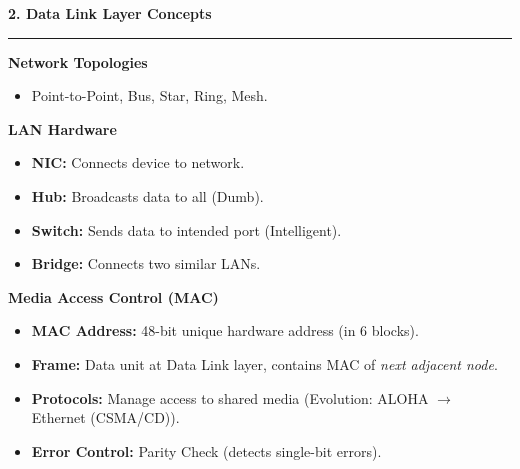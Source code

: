 \documentclass[a4paper, 8pt]{extarticle}
\newcommand{\sectionheading}[1]{\large\textbf{#1}\par\noindent\rule{\linewidth}{0.4pt}}
\newcommand{\subsectionheading}[1]{\normalsize\textbf{#1}}
\begin{document}
\begin{multicols}{2}
\vspace{1em}
\sectionheading{2. Data Link Layer Concepts}
\vspace{0.5em}
\subsectionheading{Network Topologies}
\begin{itemize}
    \item Point-to-Point, Bus, Star, Ring, Mesh.
\end{itemize}
\subsectionheading{LAN Hardware}
\begin{itemize}
    \item \textbf{NIC:} Connects device to network.
    \item \textbf{Hub:} Broadcasts data to all (Dumb).
    \item \textbf{Switch:} Sends data to intended port (Intelligent).
    \item \textbf{Bridge:} Connects two similar LANs.
\end{itemize}
\subsectionheading{Media Access Control (MAC)}
\begin{itemize}
    \item \textbf{MAC Address:} 48-bit unique hardware address (in 6 blocks).
    \item \textbf{Frame:} Data unit at Data Link layer, contains MAC of \textit{next adjacent node}.
    \item \textbf{Protocols:} Manage access to shared media (Evolution: ALOHA $\rightarrow$ Ethernet (CSMA/CD)).
    \item \textbf{Error Control:} Parity Check (detects single-bit errors).
\end{itemize}

\columnbreak %



\end{multicols}
\end{document}
